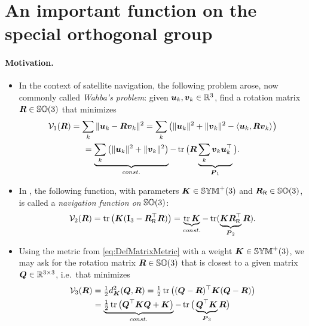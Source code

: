\section{An important function on the special orthogonal group}\label{sec:AppendixAttitudePotential}
\paragraph{Motivation.}
\begin{itemize}
\item In the context of satellite navigation, the following problem \cite{Wahba:WahbaProblem} arose, now commonly called \textit{Wahba's problem}: given $\tuple{u}_k, \tuple{v}_k \in \RealNum^3$, find a rotation matrix $\R \in \SpecialOrthogonalGroup(3)$ that minimizes
\begin{multline}
 \potentialEnergy_1(\R) = \sum_k \norm{\tuple{u}_k - \R \tuple{v}_k}^2
 = \sum_k \big( \norm{\tuple{u}_k}^2 + \norm{\tuple{v}_k}^2 - \sProd{\tuple{u}_k}{\R \tuple{v}_k} \big)
\\
 = \underbrace{\sum_k \big( \norm{\tuple{u}_k}^2 + \norm{\tuple{v}_k}^2 \big)}_{\const} - \tr\big( \R \underbrace{\sum_k \tuple{v}_k \tuple{u}_k^\top}_{\mat{P}_1} \big).
\end{multline}

\item In \cite{Koditschek:TotalEnergy}, the following function, with parameters $\mat{K}\in\SymMatP(3)$ and $\RR\in\SpecialOrthogonalGroup(3)$, is called a \textit{navigation function on} $\SpecialOrthogonalGroup(3)$:
\begin{align}
 \potentialEnergy_2(\R) = \tr\big(\mat{K}(\idMat[3] - \RR^\top\R)\big) = \underbrace{\tr\mat{K}}_{\const} - \tr(\underbrace{\mat{K}\RR^\top}_{\mat{P}_2}\R).
\end{align}

\item Using the metric from \eqref{eq:DefMatrixMetric} with a weight $\mat{K}\in\SymMatP(3)$, we may ask for the rotation matrix $\R \in \SpecialOrthogonalGroup(3)$ that is closest to a given matrix $\mat{Q}\in\RealNum^{3\times3}$, i.e.\ that minimizes
\begin{multline}
 \potentialEnergy_3(\R) = \tfrac{1}{2} \metricSq[\mat{K}]{\mat{Q}}{\R} 
 = \tfrac{1}{2} \tr\big( (\mat{Q}-\R)^\top \mat{K} (\mat{Q}-\R) \big)
\\
 = \underbrace{\tfrac{1}{2} \tr\big( \mat{Q}^\top \mat{K} \mat{Q} + \mat{K} \big)}_{\const} - \tr\big( \underbrace{\mat{Q}^\top \mat{K}}_{\mat{P}_3} \R \big)
\end{multline}
\end{itemize}

